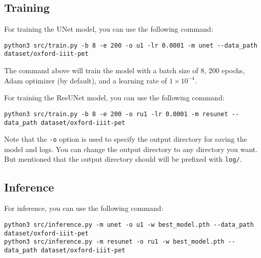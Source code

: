 \subsection{Training}

For training the UNet model, you can use the following command:

\begin{verbatim}
python3 src/train.py -b 8 -e 200 -o u1 -lr 0.0001 -m unet --data_path dataset/oxford-iiit-pet
\end{verbatim}

The command above will train the model with a batch size of 8, 200 epochs, Adam optimizer (by default), and a learning rate of $1 \times 10^{-4}$.

For training the ResUNet model, you can use the following command:

\begin{verbatim}
python3 src/train.py -b 8 -e 200 -o ru1 -lr 0.0001 -m resunet --data_path dataset/oxford-iiit-pet
\end{verbatim}

Note that the \texttt{-o} option is used to specify the output directory for saving the model and logs. You can change the output directory to any directory you want.
But mentioned that the output directory should will be prefixed with \texttt{log/}.

\subsection{Inference}

For inference, you can use the following command:

\begin{verbatim}
python3 src/inference.py -m unet -o u1 -w best_model.pth --data_path dataset/oxford-iiit-pet
python3 src/inference.py -m resunet -o ru1 -w best_model.pth --data_path dataset/oxford-iiit-pet
\end{verbatim}
